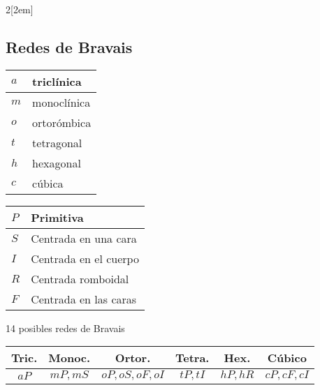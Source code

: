 \documentclass[leqno]{article}
\begin{document}
\begin{multicols}{2}[\columnsep2em]
\subsection{Redes de Bravais}
\begin{minipage}{0.45\columnwidth}
\begin{center}
\begin{tabular}{|l|l|}
\hline
$a$ & triclínica  \\ \hline
$m$ & monoclínica\\ \hline
$o$ & ortorómbica\\ \hline
$t$ & tetragonal \\ \hline
$h$ & hexagonal\\ \hline
$c$ & cúbica \\ \hline
\end{tabular}
\end{center}
\end{minipage}
\begin{minipage}{0.45\columnwidth}
\begin{center}
\begin{tabular}{|l|l|}
\hline
$P$ & Primitiva \\\hline
$S$ & Centrada en una cara\\\hline
$I$ & Centrada en el cuerpo\\\hline
$R$ & Centrada romboidal\\\hline
$F$ & Centrada en las caras \\\hline
\end{tabular}
\end{center}
\end{minipage}

14 posibles redes de Bravais
\begin{center}
\begin{tabular}{|c|c|c|c|c|c|}
\hline
Tric. & Monoc. & Ortor. & Tetra. & Hex. & Cúbico \\\hline
$aP$ &  $mP, mS$ &  $oP, oS, oF, oI$ &  $tP, tI$ &  $hP, hR$ &  $cP, cF, cI$ \\\hline
\end{tabular}
\end{center}


\end{multicols}
\end{document}
